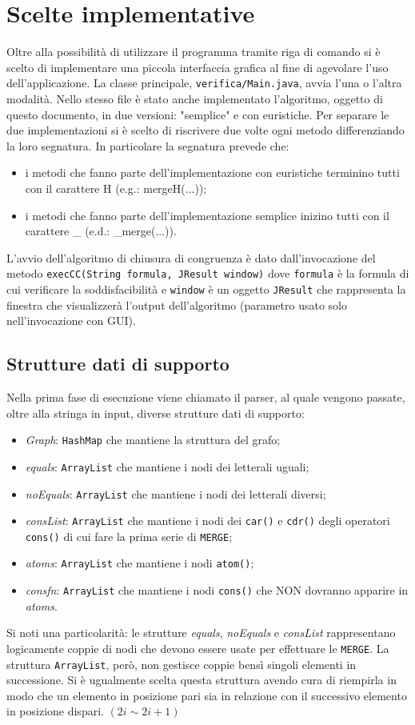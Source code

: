 \documentclass[a4paper,11pt]{article}
\begin{document}
\section{Scelte implementative}
Oltre alla possibilità di utilizzare il programma tramite riga di comando si è scelto di implementare una piccola interfaccia grafica al fine di agevolare l'uso dell'applicazione.
La classe principale, {\tt verifica/Main.java}, avvia l'una o l'altra modalità.
Nello stesso file è stato anche implementato l'algoritmo, oggetto di questo documento, in due versioni: "semplice" e con euristiche.
Per separare le due implementazioni si è scelto di riscrivere due volte ogni metodo differenziando la loro segnatura.
In particolare la segnatura prevede che:
\begin{itemize}
	\item i metodi che fanno parte dell'implementazione con euristiche terminino tutti con il carattere H (e.g.: mergeH(...));
	\item i metodi che fanno parte dell'implementazione semplice inizino tutti con il carattere \_ (e.d.: \_merge(...)).
\end{itemize}
L'avvio dell'algoritmo di chiusura di congruenza è dato dall'invocazione del metodo  
{\tt execCC(String formula, JResult window)}
dove {\tt formula} è la formula di cui verificare la soddisfacibilità e {\tt window} è un oggetto {\tt JResult} che rappresenta la finestra che visualizzerà l'output dell'algoritmo (parametro usato solo nell'invocazione con GUI).
\subsection{Strutture dati di supporto}
Nella prima fase di esecuzione viene chiamato il parser, al quale vengono passate, oltre alla stringa in input, diverse strutture dati di supporto:
\begin{itemize}
	\item \emph{Graph}: {\tt HashMap} che mantiene la struttura del grafo;
	\item \emph{equals}: {\tt ArrayList} che mantiene i nodi dei letterali uguali;
	\item \emph{noEquals}: {\tt ArrayList} che mantiene i nodi dei letterali diversi;
	\item \emph{consList}: {\tt ArrayList} che mantiene i nodi dei {\tt car()} e {\tt cdr()} degli operatori {\tt cons()} di cui fare la prima serie di {\tt MERGE};
	\item \emph{atoms}: {\tt ArrayList} che mantiene i nodi {\tt atom()};
	\item \emph{consfn}: {\tt ArrayList} che mantiene i nodi {\tt cons()} che NON dovranno apparire in \emph{atoms}.
\end{itemize}
Si noti una particolarità: le strutture \emph{equals}, \emph{noEquals} e \emph{consList} rappresentano logicamente coppie di nodi che devono essere usate per effettuare le {\tt MERGE}.
La struttura {\tt ArrayList}, però, non gestisce coppie bensì singoli elementi in successione.
Si è ugualmente scelta questa struttura avendo cura di riempirla in modo che un elemento in posizione pari sia in relazione con il successivo elemento in posizione dispari. $(2i \sim 2i+1)$
\end{document}

